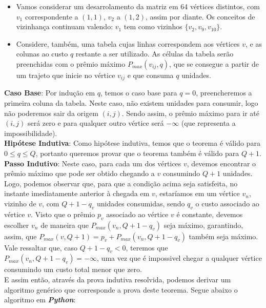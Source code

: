 \documentclass[paper=a4, fontsize=11pt]{scrartcl} %
\numberwithin{equation}{section} %
\numberwithin{figure}{section} %
\numberwithin{table}{section} %
\begin{document}
\begin{itemize}
   \item Vamos considerar um desarrolamento da matriz em 64 vértices distintos, com $v_1$ correspondente a $(1,1)$, $v_2$ a $(1,2)$, assim por diante. Os conceitos de vizinhança continuam valendo: $v_1$ tem como vizinhos $\{v_2, v_9, v_10\}$.
   \item Considere, também, uma tabela cujas linhas correspondem aos vértices $v$, e as colunas ao custo $q$ restante a ser utilizado. As células da tabela serão preenchidas com o prêmio máximo $P_{max}(v_{ij},q)$, que se consegue a partir de um trajeto que inicie no vértice $v_{ij}$ e que consuma $q$ unidades.
\end{itemize}

\textbf{Caso Base}: Por indução em $q$, temos o caso base para $q = 0$, preencheremos a primeira coluna da tabela. Neste caso, não existem unidades para consumir, logo não poderemos sair da origem $(i,j)$. Sendo assim, o prêmio máximo para ir até $(i,j)$ será zero e para qualquer outro vértice será $-\infty$ (que representa a impossibilidade). \\

\textbf{Hipótese Indutiva}: Como hipótese indutiva, temos que o teorema é válido para $0 \leq q \leq Q$, portanto queremos provar que o teorema também é válido para $Q+1$. \\

\textbf{Passo Indutivo}: Neste caso, para cada um dos vértices $v$, devemos encontrar o prêmio máximo que pode ser obtido chegando a $v$ consumindo $Q+1$ unidades. Logo, podemos observar que, para que a condição acima seja satisfeita, no instante imediatamente anterior à chegada em $v$, estaríamos em um vértice $v_n$, vizinho de $v$, com $Q+1-q_v$ unidades consumidas, sendo $q_v$ o custo associado ao vértice $v$. Visto que o prêmio $p_v$ associado ao vértice $v$ é constante, devemos escolher $v_n$ de maneira que $P_{max}(v_n,Q+1-q_v)$ seja máximo, garantindo, assim, que $P_{max}(v,Q+1) = p_v + P_{max}(v_n,Q+1-q_v)$ também seja máximo. Vale ressaltar que, caso $Q+1-q_v < 0$, teremos que $P_{max}(v_n,Q+1-q_v) = -\infty$, uma vez que é impossivel chegar a qualquer vértice consumindo um custo total menor que zero. \\

E assim então, através da prova indutiva resolvida, podemos derivar um algoritmo genérico que corresponde a prova deste teorema. Segue abaixo o algoritmo em \emph{\textbf{Python}}:\\
\end{document}
